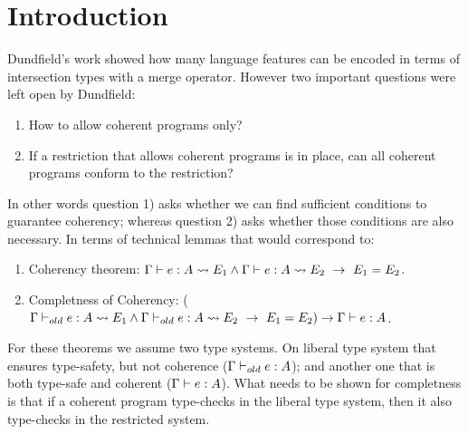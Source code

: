 \documentclass[nocopyrightspace,preprint,times,9pt]{sigplanconf}
\begin{document}



\section{Introduction}

Dundfield's work showed how many language features can be encoded in terms
of intersection types with a merge operator. However two important
questions were left open by Dundfield:

\begin{enumerate}

\item How to allow coherent programs only?

\item If a restriction that allows coherent programs is in place, can
  all coherent programs conform to the restriction?

\end{enumerate}

In other words question 1) asks whether we can find sufficient
conditions to guarantee coherency; whereas question 2) asks
whether those conditions are also necessary. In terms of technical
lemmas that would correspond to:

\begin{enumerate}

\item Coherency theorem: $\Gamma \vdash e : A \leadsto E_1 \wedge
  \Gamma \vdash e : A \leadsto E_2~\to~E_1 = E_2$.

\item Completness of Coherency: ($\Gamma \vdash_{old} e : A \leadsto E_1 \wedge
  \Gamma \vdash_{old} e : A \leadsto E_2~\to~E_1 = E_2) \to \Gamma
  \vdash e : A$.

\end{enumerate}

For these theorems we assume two type systems. On liberal type system
that ensures type-safety, but not coherence ($\Gamma \vdash_{old} e :
A$); and another one that is both type-safe and coherent  ($\Gamma \vdash e :
A$). What needs to be shown for completness is that if a coherent
program type-checks in the liberal type system, then it also
type-checks in the restricted system.
\end{document}
